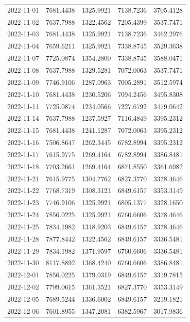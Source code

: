 \begin{footnotesize}
\begin{longtable}{lllll}
2022-11-01 & 7681.4438 & 1325.9921 & 7138.7236 & 3705.4128 \\
2022-11-02 & 7637.7988 & 1322.4562 & 7205.4399 & 3537.7471 \\
2022-11-03 & 7681.4438 & 1325.9921 & 7138.7236 & 3462.2976 \\
2022-11-04 & 7659.6211 & 1325.9921 & 7338.8745 & 3529.3638 \\
2022-11-07 & 7725.0874 & 1354.2800 & 7338.8745 & 3588.0471 \\
2022-11-08 & 7637.7988 & 1329.5281 & 7072.0063 & 3537.7471 \\
2022-11-09 & 7746.9106 & 1287.0963 & 7005.2891 & 3512.5974 \\
2022-11-10 & 7681.4438 & 1230.5206 & 7094.2456 & 3495.8308 \\
2022-11-11 & 7725.0874 & 1234.0566 & 7227.6792 & 3479.0642 \\
2022-11-14 & 7637.7988 & 1237.5927 & 7116.4849 & 3395.2312 \\
2022-11-15 & 7681.4438 & 1241.1287 & 7072.0063 & 3395.2312 \\
2022-11-16 & 7506.8647 & 1262.3445 & 6782.8994 & 3395.2312 \\
2022-11-17 & 7615.9775 & 1269.4164 & 6782.8994 & 3386.8481 \\
2022-11-18 & 7703.2661 & 1269.4164 & 6871.8550 & 3361.6982 \\
2022-11-21 & 7615.9775 & 1304.7762 & 6827.3770 & 3378.4646 \\
2022-11-22 & 7768.7319 & 1308.3121 & 6849.6157 & 3353.3149 \\
2022-11-23 & 7746.9106 & 1325.9921 & 6805.1377 & 3328.1650 \\
2022-11-24 & 7856.0225 & 1325.9921 & 6760.6606 & 3378.4646 \\
2022-11-25 & 7834.1982 & 1318.9203 & 6849.6157 & 3378.4646 \\
2022-11-28 & 7877.8442 & 1322.4562 & 6849.6157 & 3336.5481 \\
2022-11-29 & 7834.1982 & 1371.9597 & 6760.6606 & 3336.5481 \\
2022-11-30 & 8117.8892 & 1368.4240 & 6760.6606 & 3386.8481 \\
2022-12-01 & 7856.0225 & 1379.0319 & 6849.6157 & 3319.7815 \\
2022-12-02 & 7799.0615 & 1361.3521 & 6827.3770 & 3353.3149 \\
2022-12-05 & 7689.5244 & 1336.6002 & 6849.6157 & 3219.1821 \\
2022-12-06 & 7601.8955 & 1347.2081 & 6382.5967 & 3017.9836 \\

\end{longtable}
\end{footnotesize}
